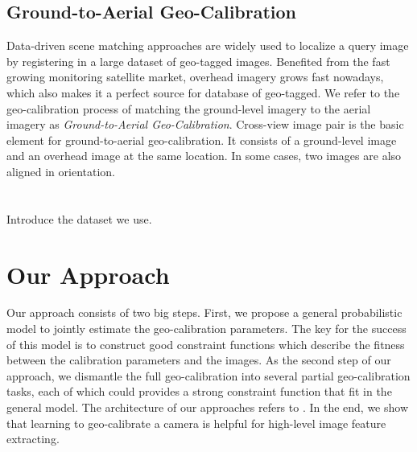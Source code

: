 \subsection{Ground-to-Aerial Geo-Calibration}
Data-driven scene matching approaches are widely used to localize a
query image by registering in a large dataset of geo-tagged images. 
Benefited from the fast growing monitoring satellite market, overhead
imagery grows fast nowadays, which also makes it a perfect source for
database of geo-tagged. We refer to the geo-calibration process of
matching the ground-level imagery to the aerial imagery as {\em
Ground-to-Aerial Geo-Calibration}.
%
Cross-view image pair is the basic element for ground-to-aerial
geo-calibration. It consists of a ground-level image and an overhead
image at the same location. In some cases, two images are also aligned
in orientation. 


\section{}
Introduce the dataset we use.

\section{Our Approach}
Our approach consists of two big steps. First, we propose a general
probabilistic model to jointly estimate the geo-calibration
parameters. The key for the success of this model is to construct good
constraint functions which describe the fitness between the calibration
parameters and the images. As the second step of our approach, we
dismantle the full geo-calibration into several partial
geo-calibration tasks, each of which could provides a strong constraint
function that fit in the general model. The architecture of
our approaches refers to .
%
In the end, we show that learning to geo-calibrate a camera is helpful
for high-level image feature extracting.


